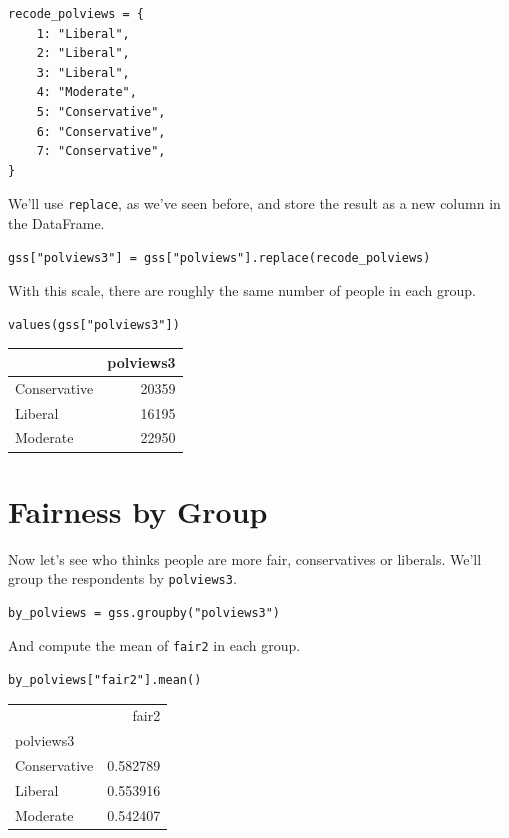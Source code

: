 \begin{lstlisting}[]
recode_polviews = {
    1: "Liberal",
    2: "Liberal",
    3: "Liberal",
    4: "Moderate",
    5: "Conservative",
    6: "Conservative",
    7: "Conservative",
}
\end{lstlisting}

We'll use \passthrough{\lstinline!replace!}, as we've seen before, and
store the result as a new column in the DataFrame.

\begin{lstlisting}[]
gss["polviews3"] = gss["polviews"].replace(recode_polviews)
\end{lstlisting}

With this scale, there are roughly the same number of people in each
group.

\begin{lstlisting}[]
values(gss["polviews3"])
\end{lstlisting}

\begin{tabular}{lr}
\midrule
{} &  polviews3 \\
\midrule
Conservative &      20359 \\
Liberal      &      16195 \\
Moderate     &      22950 \\
\midrule
\end{tabular}

\hypertarget{fairness-by-group}{%
\section{Fairness by Group}\label{fairness-by-group}}

Now let's see who thinks people are more fair, conservatives or
liberals. We'll group the respondents by
\passthrough{\lstinline!polviews3!}.

\begin{lstlisting}[]
by_polviews = gss.groupby("polviews3")
\end{lstlisting}

And compute the mean of \passthrough{\lstinline!fair2!} in each group.

\begin{lstlisting}[]
by_polviews["fair2"].mean()
\end{lstlisting}

\begin{tabular}{lr}
\midrule
{} &     fair2 \\
polviews3    &           \\
\midrule
Conservative &  0.582789 \\
Liberal      &  0.553916 \\
Moderate     &  0.542407 \\
\midrule
\end{tabular}

